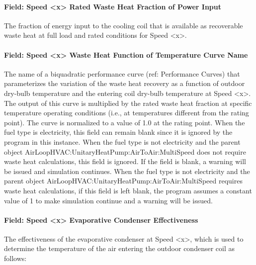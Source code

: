 \paragraph{Field: Speed \textless{}x\textgreater{} Rated Waste Heat Fraction of Power Input}\label{field-speed-x-rated-waste-heat-fraction-of-power-input}

The fraction of energy input to the cooling coil that is available as recoverable waste heat at full load and rated conditions for Speed \textless{}x\textgreater{}.

\paragraph{Field: Speed \textless{}x\textgreater{} Waste Heat Function of Temperature Curve Name}\label{field-speed-x-waste-heat-function-of-temperature-curve-name}

The name of a biquadratic performance curve (ref: Performance Curves) that parameterizes the variation of the waste heat recovery as a function of outdoor dry-bulb temperature and the entering coil dry-bulb temperature at Speed \textless{}x\textgreater{}. The output of this curve is multiplied by the rated waste heat fraction at specific temperature operating conditions (i.e., at temperatures different from the rating point). The curve is normalized to a value of 1.0 at the rating point. When the fuel type is electricity, this field can remain blank since it is ignored by the program in this instance. When the fuel type is not electricity and the parent object AirLoopHVAC:UnitaryHeatPump:AirToAir:MultiSpeed does not require waste heat calculations, this field is ignored. If the field is blank, a warning will be issued and simulation continues. When the fuel type is not electricity and the parent object AirLoopHVAC:UnitaryHeatPump:AirToAir:MultiSpeed requires waste heat calculations, if this field is left blank, the program assumes a constant value of 1 to make simulation continue and a warning will be issued.

\paragraph{Field: Speed \textless{}x\textgreater{} Evaporative Condenser Effectiveness}\label{field-speed-x-evaporative-condenser-effectiveness}

The effectiveness of the evaporative condenser at Speed \textless{}x\textgreater{}, which is used to determine the temperature of the air entering the outdoor condenser coil as follows:

